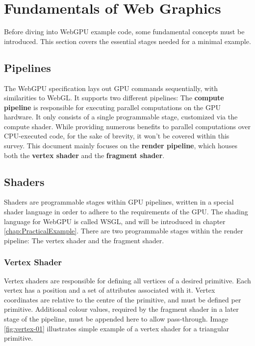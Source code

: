 %
%
% 
% 

\chapter{Fundamentals of Web Graphics}

\label{chap:Fundamentals}

Before diving into WebGPU example code, some fundamental concepts must be introduced.
This section covers the essential stages needed for a minimal example.

\section{Pipelines}
The WebGPU specification lays out GPU commands sequentially, with similarities to WebGL.
It supports two different pipelines:
The \textbf{compute pipeline} is responsible for executing parallel
computations on the GPU hardware. It only consists of a single programmable
stage, customized via the compute shader.
While providing numerous benefits to parallel computations over CPU-executed code, for the sake of brevity, it won't be covered within this survey.
This document mainly focuses on the \textbf{render pipeline}, which houses both the \textbf{vertex shader} and the \textbf{fragment shader}.

\section{Shaders}
Shaders are programmable stages within GPU pipelines, written in a special shader language in order to adhere
to the requirements of the GPU.
The shading language for WebGPU is called WSGL, and will be introduced in chapter \ref{chap:PracticalExample}.
There are two programmable stages within the render pipeline:
The vertex shader and the fragment shader.

\subsection{Vertex Shader}
Vertex shaders are responsible for defining all vertices of a desired primitive.
Each vertex has a position and a set of attributes associated with it.
Vertex coordinates are relative to the centre of the primitive, and must be defined per primitive.
Additional colour values, required by the fragment shader in a later stage of the pipeline, must be appended here to allow pass-through.
Image \ref{fig:vertex-01} illustrates simple example of a vertex shader for a triangular primitive.

